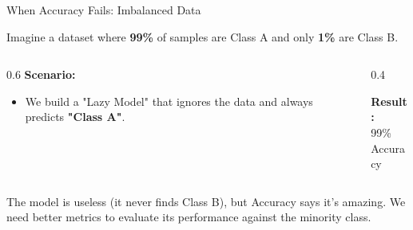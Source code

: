 \begin{frame}{When Accuracy Fails: Imbalanced Data}

        Imagine a dataset where \textbf{99\%} of samples are Class A and only \textbf{1\%} are Class B.

    \vspace{1.5em}

    \begin{columns}[c]
        \begin{column}{0.6\textwidth}
            \textbf{Scenario:}
            \begin{itemize}
                \item We build a "Lazy Model" that ignores the data and always predicts \textbf{"Class A"}.
            \end{itemize}
        \end{column}
        
        \begin{column}{0.4\textwidth}
            \centering
            \begin{tcolorbox}[colback=red!5, colframe=red!60, boxrule=0.5pt]
                \centering \textbf{Result:}\\
                \Huge 99\% \\ 
                \normalsize Accuracy
            \end{tcolorbox}
        \end{column}
    \end{columns}

    \vspace{1.5em}
    \centering
    \begin{block}{The model is useless (it never finds Class B), but Accuracy says it's amazing. We need better metrics to evaluate its performance against the minority class.}
    \end{block}
\end{frame}

